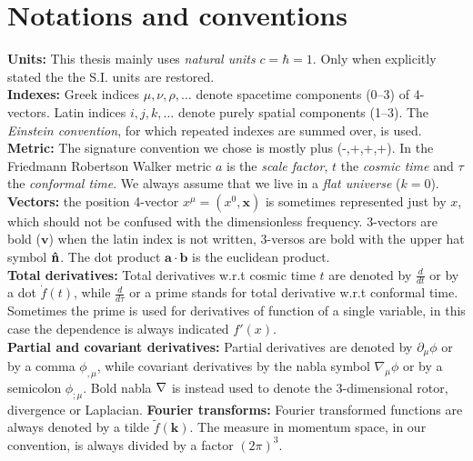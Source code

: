 \section*{Notations and conventions}
\vspace*{\fill}
\textbf{Units:} This thesis mainly uses \emph{natural units} $c=\hbar=1$. Only when explicitly stated the the S.I. units are restored.\\  
\textbf{Indexes:} Greek indices $\mu,\nu,\rho,\dots$ denote spacetime components (0--3) of 4-vectors. Latin indices $i,j,k,\dots$ denote purely spatial components (1--3). The \emph{Einstein convention}, for which repeated indexes are summed over, is used. \\
\textbf{Metric:} The signature convention we chose is mostly plus (-,+,+,+). In the Friedmann Robertson Walker metric $a$ is the \emph{scale factor}, $t$ the \emph{cosmic time} and $\tau$ the \emph{conformal time}. We always assume that we live in a \emph{flat universe} ($k=0$).\\
\textbf{Vectors:} the position 4-vector $x^\mu=(x^0,\mathbf x)$ is sometimes represented just by $x$, which should not be confused with the dimensionless frequency. 3-vectors are bold ($\mathbf v$) when the latin index is not written, 3-versos are bold with the upper hat symbol $\mathbf{\hat{n}}$. The dot product $\mathbf{a\cdot b}$ is the euclidean product. \\
\textbf{Total derivatives:} Total derivatives w.r.t cosmic time $t$ are denoted by $\tfrac d{dt}$ or by a dot $\dot f(t)$, while $\tfrac d{d\tau}$ or a prime stands for total derivative w.r.t conformal time. Sometimes the prime is used for derivatives of function of a single variable, in this case the dependence is always indicated $f'(x)$.\\
\textbf{Partial and covariant derivatives:} Partial derivatives are denoted by $\partial_\mu\phi$ or by a comma $\phi_{,\mu}$, while covariant derivatives by the nabla symbol $\nabla_\mu\phi$ or by a semicolon $\phi_{;\mu}$. Bold nabla $\bold\nabla$ is instead used to denote the 3-dimensional rotor, divergence or Laplacian.
\textbf{Fourier transforms:} Fourier transformed functions are always denoted by a tilde $\tilde f(\mathbf k)$. The measure in momentum space, in our convention, is always divided by a factor $(2\pi)^3$.  